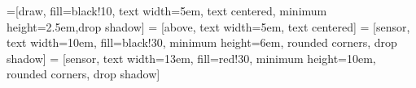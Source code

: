 \newcommand{\mx}[1]{\mathbf{\bm{#1}}} %
\newcommand{\vc}[1]{\mathbf{\bm{#1}}} %



=[draw, fill=black!10, text width=5em,
    text centered, minimum height=2.5em,drop shadow]
 = [above, text width=5em, text centered]
 = [sensor, text width=10em, fill=black!30,
    minimum height=6em, rounded corners, drop shadow]
 = [sensor, text width=13em, fill=red!30,
    minimum height=10em, rounded corners, drop shadow]

\def\blockdist{1.5}
\def\edgedist{2.5}

